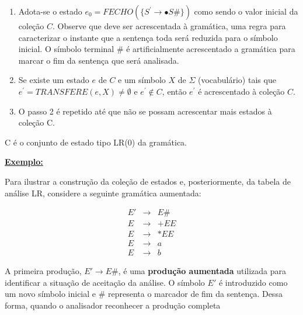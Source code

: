\documentclass[
  brazilian,
  letterpaper,
]{book}
\theoremstyle{plain}
\theoremstyle{definition}
\theoremstyle{remark}
\begin{document}
\begin{tcolorbox}[enhanced jigsaw, toptitle=1mm, rightrule=.15mm, title=\textcolor{quarto-callout-note-color}{\faInfo}\hspace{0.5em}{Coleção de estado LR(k)}, toprule=.15mm, colback=white, left=2mm, arc=.35mm, opacitybacktitle=0.6, colframe=quarto-callout-note-color-frame, breakable, coltitle=black, titlerule=0mm, bottomtitle=1mm, leftrule=.75mm, bottomrule=.15mm, opacityback=0, colbacktitle=quarto-callout-note-color!10!white]

\begin{enumerate}
\def\labelenumi{\arabic{enumi}.}
\item
  Adota-se o estado
  \(e_0 = FECHO ( \{ S^{'} \rightarrow \bullet S\# \} )\) como sendo o
  valor inicial da coleção \(C\). Observe que deve ser acrescentada à
  gramática, uma regra para caracterizar o instante que a sentença toda
  será reduzida para o símbolo inicial. O símbolo terminal \# é
  artificialmente acrescentado a gramática para marcar o fim da sentença
  que será analisada.
\item
  Se existe um estado \(e\) de \(C\) e um símbolo \(X\) de \(\Sigma\)
  (vocabulário) tais que \(e^{'} = TRANSFERE (e, X) \neq \emptyset\) e
  \(e^{'} \notin C\), então \(e^{'}\) é acrescentado à coleção \(C\).
\item
  O passo 2 é repetido até que não se possam acrescentar mais estados à
  coleção C.
\end{enumerate}

\end{tcolorbox}

C é o conjunto de estado tipo LR(0) da gramática.

\ul{\textbf{Exemplo:}}

Para ilustrar a construção da coleção de estados e, posteriormente, da
tabela de análise LR, considere a seguinte gramática aumentada:

\[
\begin{array}{rcl}
E' &\rightarrow& E\#\\
E  &\rightarrow& +EE\\
E  &\rightarrow& *EE\\
E  &\rightarrow& a\\
E  &\rightarrow& b
\end{array}
\]

A primeira produção, \(E'\rightarrow E\#\), é uma \textbf{produção
aumentada} utilizada para identificar a situação de aceitação da
análise. O símbolo \(E'\) é introduzido como um novo símbolo inicial e
\(\#\) representa o marcador de fim da sentença. Dessa forma, quando o
analisador reconhecer a produção completa
\end{document}
